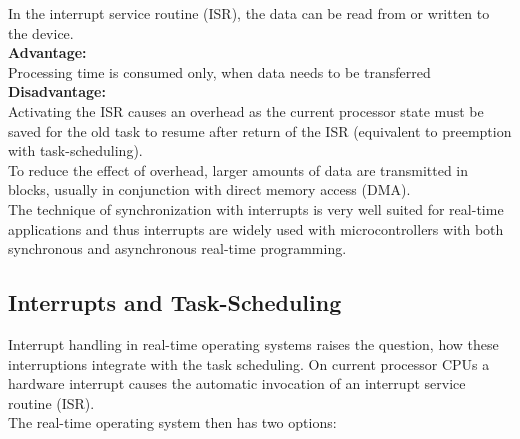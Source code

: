 In the interrupt service routine (ISR), the data can be read from or written to the device.\\

\textbf{Advantage: }\\Processing time is consumed only, when data needs to be transferred\\

\textbf{Disadvantage: }\\Activating the ISR causes an overhead as the current processor state must be    saved for the old task to resume after return of the ISR    (equivalent to preemption with task-scheduling).\\

To reduce the effect of overhead, larger amounts of data are transmitted in blocks, usually in conjunction with direct memory access (DMA).\\

The technique of synchronization with interrupts is very well suited for real-time applications and thus interrupts are widely used with microcontrollers with both synchronous and asynchronous real-time programming.

\subsection{Interrupts and Task-Scheduling}

Interrupt handling in real-time operating systems raises the question, how these interruptions integrate with the task scheduling. On current processor CPUs a hardware interrupt causes the automatic invocation of an interrupt service routine (ISR). \\

The real-time operating system then has two options:

